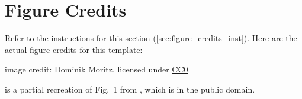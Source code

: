 \documentclass{vgtc}                          %
\begin{document}
\section*{Figure Credits}
\label{sec:figure_credits}

Refer to the instructions for this section (\cref{sec:figure_credits_inst}).
Here are the actual figure credits for this template:

 image credit: Dominik Moritz, licensed under \href{https://creativecommons.org/public-domain/cc0/}{CC0}.

 is a partial recreation of Fig.\ 1 from \cite{Isenberg:2017:VMC}, which is in the public domain.


%

%
%
%


\end{document}
